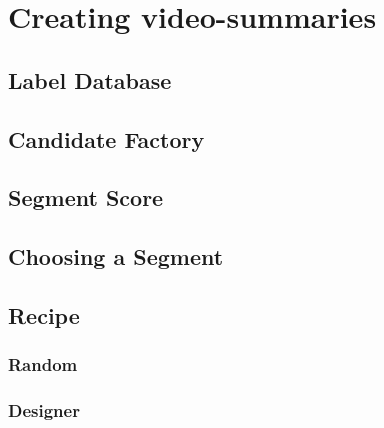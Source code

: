 %
\section{Creating video-summaries}
%

%
\subsection{Label Database}
%

%
\subsection{Candidate Factory}
%

%
\subsection{Segment Score}
%

%
\subsection{Choosing a Segment}
%

%
\subsection{Recipe}
%

%
\subsubsection{Random}
%

%
\subsubsection{Designer}
%